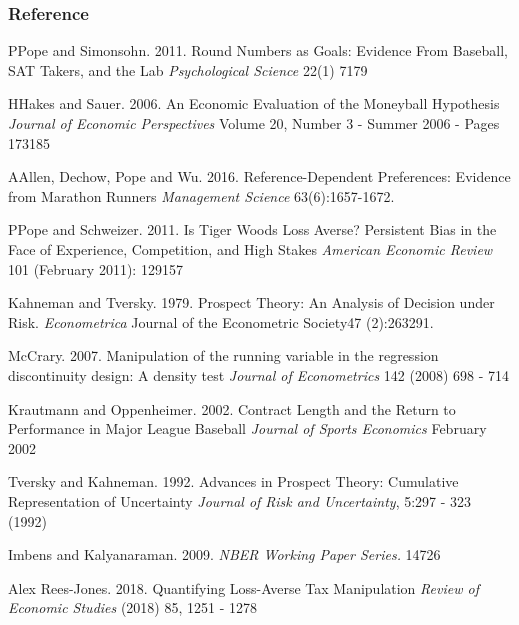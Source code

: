 \documentclass[dvipdfmx,12pt]{beamer}
\begin{document}
\begin{frame}\frametitle{Reference}
  \tiny
  \begin{thebibliography}{99}
    \bibitem PPope and Simonsohn. 2011.
    Round Numbers as Goals: Evidence From Baseball, SAT Takers, and the Lab
    \textit{Psychological Science} 22(1) 7179

    \bibitem HHakes and Sauer. 2006.
    An Economic Evaluation of the Moneyball Hypothesis
    \textit{Journal of Economic Perspectives} Volume 20, Number 3 - Summer 2006 - Pages 173185

    \bibitem AAllen, Dechow, Pope and Wu. 2016.
    Reference-Dependent Preferences: Evidence from Marathon Runners \textit{Management Science} 63(6):1657-1672.

    \bibitem PPope and Schweizer. 2011.
    Is Tiger Woods Loss Averse? Persistent Bias in the Face of Experience, Competition, and High Stakes
    \textit{American Economic Review} 101 (February 2011): 129157

    \bibitem{}Kahneman and Tversky. 1979.
    Prospect Theory: An Analysis of Decision under Risk.
    \textit{Econometrica}
    Journal of the Econometric Society47 (2):263291.

    \bibitem{}McCrary. 2007.
    Manipulation of the running variable in the regression discontinuity design: A density test
    \textit{Journal of Econometrics} 142 (2008) 698 - 714

    \bibitem{}Krautmann and Oppenheimer. 2002.
    Contract Length and the Return to Performance in Major League Baseball
    \textit{Journal of Sports Economics} February 2002

    \bibitem{}Tversky and Kahneman. 1992.
    Advances in Prospect Theory: Cumulative Representation of Uncertainty
    \textit{Journal of Risk and Uncertainty}, 5:297 - 323 (1992)

    \bibitem{}Imbens and Kalyanaraman. 2009.
    \textit{NBER Working Paper Series.} 14726

    \bibitem{}Alex Rees-Jones. 2018.
    Quantifying Loss-Averse Tax Manipulation
    \textit{Review of Economic Studies} (2018) 85, 1251 - 1278
  \end{thebibliography}

\end{frame}
\end{document}
